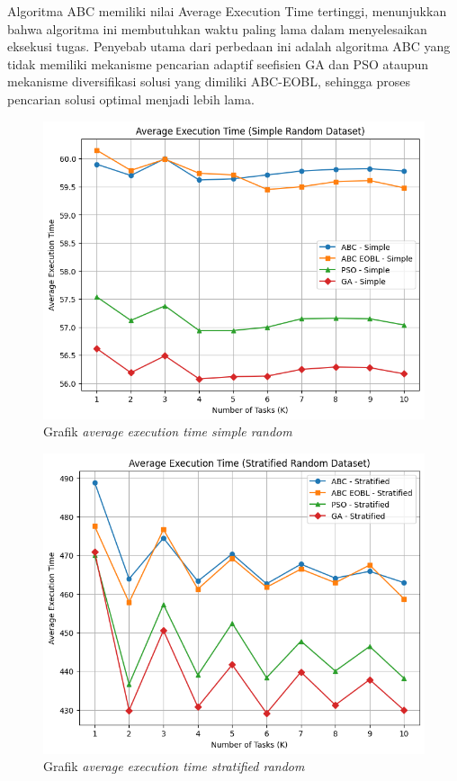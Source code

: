 Algoritma ABC memiliki nilai Average Execution Time tertinggi, menunjukkan bahwa algoritma ini membutuhkan waktu paling lama dalam menyelesaikan eksekusi tugas. Penyebab utama dari perbedaan ini adalah algoritma ABC yang tidak memiliki mekanisme pencarian adaptif seefisien GA dan PSO ataupun mekanisme diversifikasi solusi yang dimiliki ABC-EOBL, sehingga proses pencarian solusi optimal menjadi lebih lama.

\newpage

\begin{figure} [H]
    \centering
    \includegraphics[width=0.75\linewidth]{gambar/Grafik Average Execution Time Simple Random.png}
    \caption{Grafik \textit{average execution time simple random}}
\end{figure}

\begin{figure} [H]
    \centering
    \includegraphics[width=0.75\linewidth]{gambar/Grafik Average Execution Time Stratified Random.png}
    \caption{Grafik \textit{average execution time stratified random}}
\end{figure}


